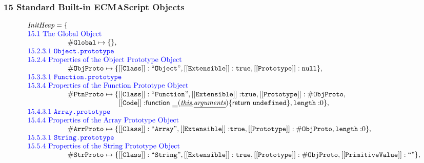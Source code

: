 \documentclass[a4paper, leqno]{amsart}
\newcommand{\ir}[1]{\ensuremath{\underline{#1}}}
\def\inblue{\color{blue}}
\newcommand{\nullK}{{\tt null}}
\newcommand{\undef}{{\tt undefined}}
\newcommand{\true}{{\tt true}}
\renewcommand{\lg}{{\tt \#Global}}
\def\inblue{\color{blue}}
\begin{document}
\subsubsection*{15 Standard Built-in ECMAScript Objects}
\[
\begin{array}{rl}

\multicolumn{2}{l}{\emph{InitHeap} = \{}\\
\multicolumn{2}{l}{\mbox{\inblue 15.1 The Global Object}}\\
\multicolumn{2}{l}{\phantom{\emph{InitHeap} = \{}
\lg\mapsto \{\},}\\
\multicolumn{2}{l}{\mbox{\inblue 15.2.3.1 {\tt Object.prototype}}}\\
\multicolumn{2}{l}{\mbox{\inblue 15.2.4 Properties of the Object Prototype Object}}\\
\multicolumn{2}{l}{\phantom{\emph{InitHeap} = \{}
{\tt\#ObjProto} \mapsto
\{{\tt [[Class]]: ``Object"}, {\tt [[Extensible]]: \true}, {\tt [[Prototype]]: \nullK}\},}\\

\multicolumn{2}{l}{\mbox{\inblue 15.3.3.1 {\tt Function.prototype}}}\\
\multicolumn{2}{l}{\mbox{\inblue 15.3.4 Properties of the Function Prototype Object}}\\
\multicolumn{2}{l}{\phantom{\emph{InitHeap} = \{}
{\tt\#FtnProto} \mapsto \{{\tt [[Class]]: ``Function"}, {\tt [[Extensible]]:} \true,%
{\tt [[Prototype]]: \#ObjProto},}\\
\multicolumn{2}{l}{\phantom{\emph{InitHeap} = \{{\tt\#FtnProto} \mapsto \{}
{\tt [[Code]]:} {\sf function} \ \ir{\_} {\tt(}\ir{\emph{this}}{\tt,}\ir{\emph{arguments}}{\tt) \{}
{\sf return} \ \undef {\tt\}}, {\tt length:} 0\},}\\

\multicolumn{2}{l}{\mbox{\inblue 15.4.3.1 {\tt Array.prototype}}}\\
\multicolumn{2}{l}{\mbox{\inblue 15.4.4 Properties of the Array Prototype Object}}\\
\multicolumn{2}{l}{\phantom{\emph{InitHeap} = \{}
{\tt\#ArrProto} \mapsto \{{\tt [[Class]]: ``Array"}, {\tt [[Extensible]]:} \true,%
{\tt [[Prototype]]: \#ObjProto},
{\tt length:} 0\},}\\


\multicolumn{2}{l}{\mbox{\inblue 15.5.3.1 {\tt String.prototype}}}\\
\multicolumn{2}{l}{\mbox{\inblue 15.5.4 Properties of the String Prototype Object}}\\
\multicolumn{2}{l}{\phantom{\emph{InitHeap} = \{}
{\tt\#StrProto} \mapsto \{{\tt [[Class]]: ``String"}, {\tt [[Extensible]]: \true}, {\tt [[Prototype]]: \#ObjProto}, {\tt [[PrimitiveValue]]: ``"} \},}\\


\end{array}\]
\end{document}

